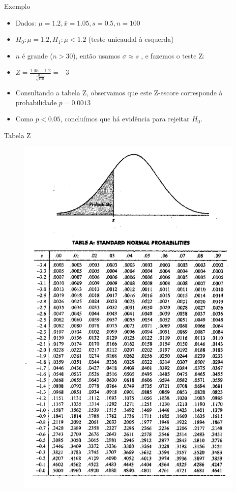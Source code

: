 \documentclass{beamer}
\begin{document}
\begin{frame}{Exemplo}
  \begin{example}
    \begin{itemize}
    \item Dados: $\mu = 1.2, \bar{x} = 1.05, s = 0.5, n=100$
    \item $H_0: \mu = 1.2, H_1: \mu < 1.2$ (teste unicaudal à esquerda)
    \item $n$ é grande ($n > 30$), então usamos $\sigma \approx s$ , e
      fazemos o teste Z:
    \item $Z = \frac{1.05 - 1.2}{\frac{0.5}{\sqrt{100}}} = -3$
    \item Consultando a tabela Z, observamos que este Z-escore
      corresponde à probabilidade $p=0.0013$
    \item Como $p < 0.05$, concluímos que há evidência para rejeitar
      $H_0$.
    \end{itemize}
  \end{example}
\end{frame}

\begin{frame}{Tabela Z}
  \begin{figure}
    \centering
      \includegraphics[height=0.9\textheight]{TH_II/z_table}
  \end{figure}
\end{frame}
\end{document}
